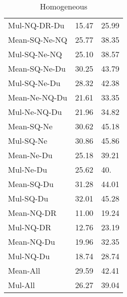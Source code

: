 \documentclass[review]{elsarticle}
\begin{document}
\begin{table}[!htbp]
\begin{subtable}[t]{.5\linewidth}
\begin{tabular}[t]{ m{2.9cm} I I}
Mul-NQ-DR-Du&15.47&25.99\\
Mean-SQ-Ne-NQ&25.77&38.35\\
Mul-SQ-Ne-NQ&25.10&38.57\\
Mean-SQ-Ne-Du&30.25&43.79\\
Mul-SQ-Ne-Du&28.32&42.38\\
Mean-Ne-NQ-Du&21.61&33.35\\
Mul-Ne-NQ-Du&21.96&34.82\\\hline
Mean-SQ-Ne & 30.62 & 45.18 \\
Mul-SQ-Ne & 30.86 & 45.86\\
Mean-Ne-Du & 25.18 & 39.21 \\
Mul-Ne-Du & 25.62 & 40.\\
Mean-SQ-Du & 31.28 & 44.01 \\
Mul-SQ-Du & 32.01 & 45.28 \\
Mean-NQ-DR& 11.00 & 19.24\\
Mul-NQ-DR&12.76&23.19\\
Mean-NQ-Du&19.96&32.35\\
Mul-NQ-Du&18.74&28.74\\\hline
Mean-All&29.59&42.41\\
Mul-All&26.27&39.04\\\hline
\hline
\end{tabular}
\caption{Homogeneous}
\label{tab:A-g1-homo}
\end{subtable}
\pagebreak

\end{table}
\end{document}
